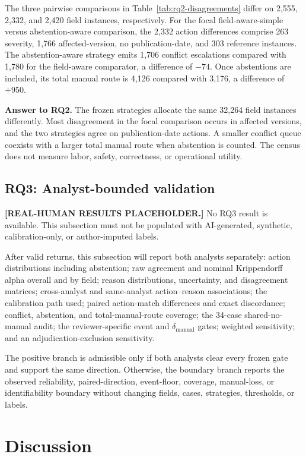 \documentclass[preprint,review,12pt,authoryear]{elsarticle}
\begin{document}
The three pairwise comparisons in Table~\ref{tab:rq2-disagreements} differ on
2,555, 2,332, and 2,420 field instances, respectively. For the focal
field-aware-simple versus abstention-aware comparison, the 2,332 action
differences comprise 263 severity, 1,766 affected-version, no publication-date,
and 303 reference instances. The abstention-aware strategy emits 1,706 conflict
escalations compared with 1,780 for the field-aware comparator, a difference of
\(-74\). Once abstentions are included, its total manual route is 4,126 compared
with 3,176, a difference of \(+950\).

\textbf{Answer to RQ2.} The frozen strategies allocate the same 32,264 field
instances differently. Most disagreement in the focal comparison occurs in
affected versions, and the two strategies agree on publication-date actions.
A smaller conflict queue coexists with a larger total manual route when
abstention is counted. The census does not measure labor, safety, correctness,
or operational utility.

\subsection{RQ3: Analyst-bounded validation}

\textbf{[REAL-HUMAN RESULTS PLACEHOLDER.]}
No RQ3 result is available. This subsection must not be populated with
AI-generated, synthetic, calibration-only, or author-imputed labels.

After valid returns, this subsection will report both analysts separately:
action distributions including abstention; raw agreement and nominal
Krippendorff alpha overall and by field; reason distributions, uncertainty, and
disagreement matrices; cross-analyst and same-analyst action--reason
associations; the calibration path used; paired action-match differences and
exact discordance; conflict, abstention, and total-manual-route coverage; the
34-case shared-no-manual audit; the reviewer-specific event and
\(\delta_{\mathrm{manual}}\) gates; weighted sensitivity; and an
adjudication-exclusion sensitivity.

The positive branch is admissible only if both analysts clear every frozen
gate and support the same direction. Otherwise, the boundary branch reports the
observed reliability, paired-direction, event-floor, coverage, manual-loss, or
identifiability boundary without changing fields, cases, strategies,
thresholds, or labels.

\section{Discussion}
\label{sec:discussion}
\end{document}
